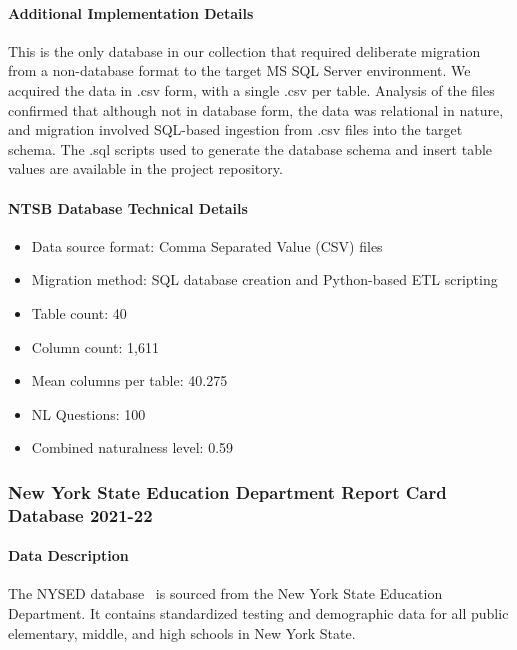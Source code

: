 \paragraph{Additional Implementation Details}
This is the only database in our collection that required deliberate migration from a non-database format to the target MS SQL Server environment.
We acquired the data in .csv form, with a single .csv per table.
Analysis of the files confirmed that although not in database form, the data was relational in nature, and migration involved SQL-based ingestion from .csv files into the target schema.
The .sql scripts used to generate the database schema and insert table values are available in the project repository.


\paragraph{NTSB Database Technical Details}
\begin{itemize}
  \item Data source format: Comma Separated Value (CSV) files
  \item Migration method: SQL database creation and Python-based ETL scripting
  \item Table count: 40
  \item Column count: 1,611
  \item Mean columns per table: 40.275
  \item NL Questions: 100
  \item Combined naturalness level: 0.59 
\end{itemize}


\subsubsection{New York State Education Department Report Card Database 2021-22}

\paragraph{Data Description}
The NYSED database~\cite{nysed-report-card} is sourced from the New York State Education Department.
It contains standardized testing and demographic data for all public elementary, middle, and high schools in New York State.

